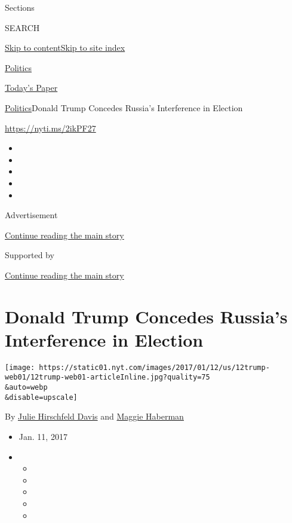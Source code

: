 Sections

SEARCH

\protect\hyperlink{site-content}{Skip to
content}\protect\hyperlink{site-index}{Skip to site index}

\href{https://www.nytimes.com/section/politics}{Politics}

\href{https://myaccount.nytimes.com/auth/login?response_type=cookie\&client_id=vi}{}

\href{https://www.nytimes.com/section/todayspaper}{Today's Paper}

\href{/section/politics}{Politics}\textbar{}Donald Trump Concedes
Russia's Interference in Election

\url{https://nyti.ms/2ikPF27}

\begin{itemize}
\item
\item
\item
\item
\item
\end{itemize}

Advertisement

\protect\hyperlink{after-top}{Continue reading the main story}

Supported by

\protect\hyperlink{after-sponsor}{Continue reading the main story}

\hypertarget{donald-trump-concedes-russias-interference-in-election}{%
\section{Donald Trump Concedes Russia's Interference in
Election}\label{donald-trump-concedes-russias-interference-in-election}}

\texttt{[image: https://static01.nyt.com/images/2017/01/12/us/12trump-web01/12trump-web01-articleInline.jpg?quality=75\\\&auto=webp\\\&disable=upscale]}

By \href{https://www.nytimes.com/by/julie-hirschfeld-davis}{Julie
Hirschfeld Davis} and
\href{http://www.nytimes.com/by/maggie-haberman}{Maggie Haberman}

\begin{itemize}
\item
  Jan. 11, 2017
\item
  \begin{itemize}
  \item
  \item
  \item
  \item
  \item
  \end{itemize}
\end{itemize}

